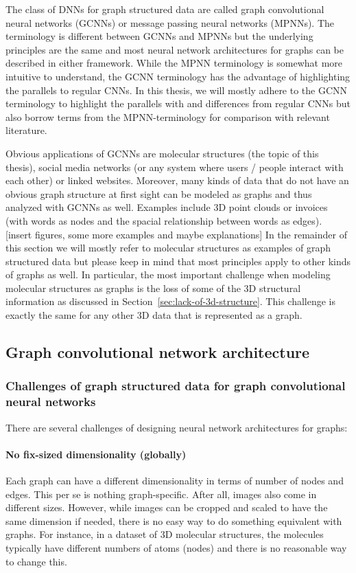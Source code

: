 The class of DNNs for graph structured data are called graph convolutional neural networks (GCNNs) or message passing neural networks (MPNNs). The terminology is different between GCNNs and MPNNs but the underlying principles are the same and most neural network architectures for graphs can be described in either framework. While the MPNN terminology is somewhat more intuitive to understand, the GCNN terminology has the advantage of highlighting the parallels to regular CNNs. In this thesis, we will mostly adhere to the GCNN terminology to highlight the parallels with and differences from regular CNNs but also borrow terms from the MPNN-terminology for comparison with relevant literature.

Obvious applications of GCNNs are molecular structures (the topic of this thesis), social media networks (or any system where users / people interact with each other) or linked websites. Moreover, many kinds of data that do not have an obvious graph structure at first sight can be modeled as graphs and thus analyzed with GCNNs as well. Examples include 3D point clouds or invoices (with words as nodes and the spacial relationship between words as edges).
[insert figures, some more examples and maybe explanations]
In the remainder of this section we will mostly refer to molecular structures as examples of graph structured data but please keep in mind that most principles apply to other kinds of graphs as well. In particular, the most important challenge when modeling molecular structures as graphs is the loss of some of the 3D structural information as discussed in Section~\ref{sec:lack-of-3d-structure}. This challenge is exactly the same for any other 3D data that is represented as a graph.

\subsection{Graph convolutional network architecture}

\subsubsection{Challenges of graph structured data for graph convolutional neural networks}
\label{sec:graph-challenges}

There are several challenges of designing neural network architectures for graphs:

\paragraph{No fix-sized dimensionality (globally)}
Each graph can have a different dimensionality in terms of number of nodes and edges. This per se is nothing graph-specific. After all, images also come in different sizes. However, while images can be cropped and scaled to have the same dimension if needed, there is no easy way to do something equivalent with graphs. For instance, in a dataset of 3D molecular structures, the molecules typically have different numbers of atoms (nodes) and there is no reasonable way to change this.

